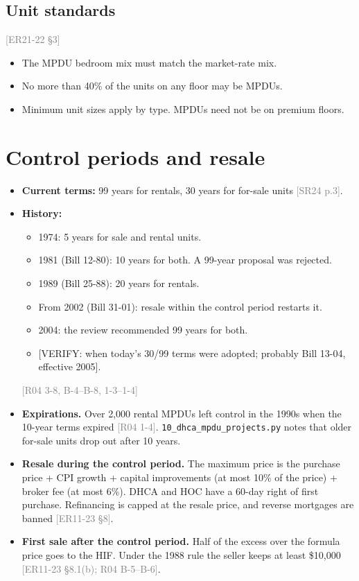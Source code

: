\documentclass[11pt]{article}
\newcommand{\verify}[1]{\textcolor{red!70!black}{[VERIFY: #1]}}
\newcommand{\src}[1]{\textcolor{gray}{\small[#1]}}
\begin{document}
\subsection*{Unit standards}
\src{ER21-22 \S3}
\begin{itemize}
  \item The MPDU bedroom mix must match the market-rate mix.
  \item No more than 40\% of the units on any floor may be MPDUs.
  \item Minimum unit sizes apply by type. MPDUs need not be on premium floors.
\end{itemize}

\section{Control periods and resale}
\begin{itemize}
  \item \textbf{Current terms:} 99 years for rentals, 30 years for for-sale units \src{SR24 p.3}.
  \item \textbf{History:}
    \begin{itemize}
      \item 1974: 5 years for sale and rental units.
      \item 1981 (Bill 12-80): 10 years for both. A 99-year proposal was rejected.
      \item 1989 (Bill 25-88): 20 years for rentals.
      \item From 2002 (Bill 31-01): resale within the control period restarts it.
      \item 2004: the review recommended 99 years for both.
      \item \verify{when today's 30/99 terms were adopted; probably Bill 13-04, effective 2005}.
    \end{itemize}
    \src{R04 3-8, B-4--B-8, 1-3--1-4}
  \item \textbf{Expirations.} Over 2,000 rental MPDUs left control in the 1990s when the 10-year terms expired \src{R04 1-4}. \texttt{10\_dhca\_mpdu\_projects.py} notes that older for-sale units drop out after 10 years.
  \item \textbf{Resale during the control period.} The maximum price is the purchase price + CPI growth + capital improvements (at most 10\% of the price) + broker fee (at most 6\%). DHCA and HOC have a 60-day right of first purchase. Refinancing is capped at the resale price, and reverse mortgages are banned \src{ER11-23 \S8}.
  \item \textbf{First sale after the control period.} Half of the excess over the formula price goes to the HIF. Under the 1988 rule the seller keeps at least \$10,000 \src{ER11-23 \S8.1(b); R04 B-5--B-6}.
\end{itemize}
\end{document}
